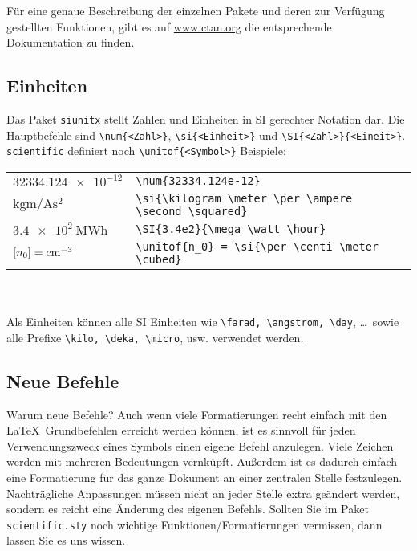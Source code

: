 \documentclass[8pt,a5paper]{scrartcl}
\begin{document}
		
	Für eine genaue Beschreibung der einzelnen Pakete und deren zur Verfügung gestellten Funktionen, gibt es auf \href{www.ctan.org}{www.ctan.org} die entsprechende Dokumentation zu finden.


	\subsection{Einheiten}
	Das Paket \verb#siunitx# stellt Zahlen und Einheiten in SI gerechter Notation dar.
	Die Hauptbefehle sind \verb#\num{<Zahl>}#, \verb#\si{<Einheit>}# und \verb#\SI{<Zahl>}{<Eineit>}#.
	\verb#scientific# definiert noch \verb#\unitof{<Symbol>}#
	Beispiele:\\
	
	\begin{tabular}{ll}
		$\num{32334.124e-12}$ & \verb#\num{32334.124e-12}#\\
		$\si{\kilogram \meter \per \ampere \second \squared }$ & \verb#\si{\kilogram \meter \per \ampere \second \squared}#\\
		$\SI{3.4e2}{\mega \watt \hour}$ & \verb#\SI{3.4e2}{\mega \watt \hour}#\\
		$\left[n_0\right] = \si{\per \centi \meter \cubed}$ & \verb#\unitof{n_0} = \si{\per \centi \meter \cubed}#\\
	\end{tabular}\\
	\\
	Als Einheiten können alle SI Einheiten wie \verb#\farad, \angstrom, \day#, \ldots\ sowie alle Prefixe \verb#\kilo, \deka, \micro#, usw.
	verwendet werden.
	


	\subsection{Neue Befehle}
	Warum neue Befehle?
	Auch wenn viele Formatierungen recht einfach mit den \LaTeX\ Grundbefehlen erreicht werden können, ist es sinnvoll für jeden Verwendungszweck eines Symbols einen eigene Befehl anzulegen. Viele Zeichen werden mit mehreren Bedeutungen vernküpft.
	Außerdem ist es dadurch einfach eine Formatierung für das ganze Dokument an einer zentralen Stelle festzulegen. Nachträgliche Anpassungen müssen nicht an jeder Stelle extra geändert werden, sondern es reicht eine Änderung des eigenen Befehls. 
	Sollten Sie im Paket \verb#scientific.sty# noch wichtige Funktionen/Formatierungen vermissen, dann lassen Sie es uns wissen.
\end{document}
